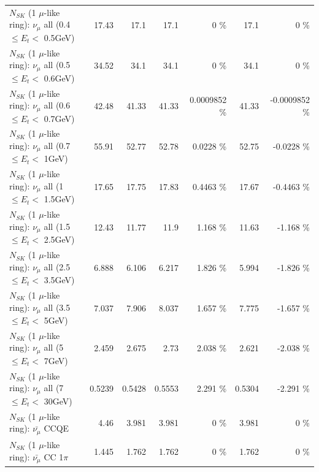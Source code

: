 \begin{table}
\begin{tabular}{| l | r | r | r  r | r  r |}
       $N_{SK}$ (1 $\mu$-like ring): $\nu_{\mu}$ all (0.4 $\leq E_{t} <$ 0.5GeV) &           17.43 &            17.1 &            17.1 &        0 \%  &            17.1 &        0 \%  \\ 
       $N_{SK}$ (1 $\mu$-like ring): $\nu_{\mu}$ all (0.5 $\leq E_{t} <$ 0.6GeV) &           34.52 &            34.1 &            34.1 &        0 \%  &            34.1 &        0 \%  \\ 
       $N_{SK}$ (1 $\mu$-like ring): $\nu_{\mu}$ all (0.6 $\leq E_{t} <$ 0.7GeV) &           42.48 &           41.33 &           41.33 & 0.0009852 \%  &           41.33 & -0.0009852 \%  \\ 
         $N_{SK}$ (1 $\mu$-like ring): $\nu_{\mu}$ all (0.7 $\leq E_{t} <$ 1GeV) &           55.91 &           52.77 &           52.78 &   0.0228 \%  &           52.75 &  -0.0228 \%  \\ 
         $N_{SK}$ (1 $\mu$-like ring): $\nu_{\mu}$ all (1 $\leq E_{t} <$ 1.5GeV) &           17.65 &           17.75 &           17.83 &   0.4463 \%  &           17.67 &  -0.4463 \%  \\ 
       $N_{SK}$ (1 $\mu$-like ring): $\nu_{\mu}$ all (1.5 $\leq E_{t} <$ 2.5GeV) &           12.43 &           11.77 &            11.9 &    1.168 \%  &           11.63 &   -1.168 \%  \\ 
       $N_{SK}$ (1 $\mu$-like ring): $\nu_{\mu}$ all (2.5 $\leq E_{t} <$ 3.5GeV) &           6.888 &           6.106 &           6.217 &    1.826 \%  &           5.994 &   -1.826 \%  \\ 
         $N_{SK}$ (1 $\mu$-like ring): $\nu_{\mu}$ all (3.5 $\leq E_{t} <$ 5GeV) &           7.037 &           7.906 &           8.037 &    1.657 \%  &           7.775 &   -1.657 \%  \\ 
           $N_{SK}$ (1 $\mu$-like ring): $\nu_{\mu}$ all (5 $\leq E_{t} <$ 7GeV) &           2.459 &           2.675 &            2.73 &    2.038 \%  &           2.621 &   -2.038 \%  \\ 
          $N_{SK}$ (1 $\mu$-like ring): $\nu_{\mu}$ all (7 $\leq E_{t} <$ 30GeV) &          0.5239 &          0.5428 &          0.5553 &    2.291 \%  &          0.5304 &   -2.291 \%  \\ 
\hline
\hline
\hline
                              $N_{SK}$ (1 $\mu$-like ring): $\bar{\nu_\mu}$ CCQE &            4.46 &           3.981 &           3.981 &        0 \%  &           3.981 &        0 \%  \\ 
                         $N_{SK}$ (1 $\mu$-like ring): $\bar{\nu_\mu}$ CC 1$\pi$ &           1.445 &           1.762 &           1.762 &        0 \%  &           1.762 &        0 \%  \\ 

\end{tabular}
\end{table}
